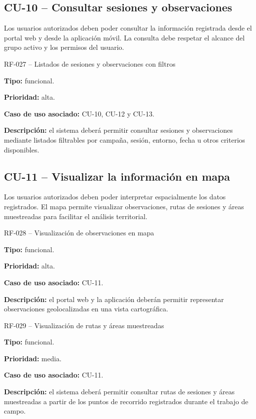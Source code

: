 \subsection{CU-10 -- Consultar sesiones y observaciones}

Los usuarios autorizados deben poder consultar la información registrada desde el
portal web y desde la aplicación móvil. La consulta debe respetar el alcance del
grupo activo y los permisos del usuario.

\begin{requisitocard}{RF-027 -- Listados de sesiones y observaciones con filtros}

\textbf{Tipo:} funcional.

\textbf{Prioridad:} alta.

\textbf{Caso de uso asociado:} CU-10, CU-12 y CU-13.

\textbf{Descripción:} el sistema deberá permitir consultar sesiones y
observaciones mediante listados filtrables por campaña, sesión, entorno, fecha u
otros criterios disponibles.

\end{requisitocard}

\subsection{CU-11 -- Visualizar la información en mapa}

Los usuarios autorizados deben poder interpretar espacialmente los datos
registrados. El mapa permite visualizar observaciones, rutas de sesiones y áreas
muestreadas para facilitar el análisis territorial.

\begin{requisitocard}{RF-028 -- Visualización de observaciones en mapa}

\textbf{Tipo:} funcional.

\textbf{Prioridad:} alta.

\textbf{Caso de uso asociado:} CU-11.

\textbf{Descripción:} el portal web y la aplicación deberán permitir representar
observaciones geolocalizadas en una vista cartográfica.

\end{requisitocard}

\begin{requisitocard}{RF-029 -- Visualización de rutas y áreas muestreadas}

\textbf{Tipo:} funcional.

\textbf{Prioridad:} media.

\textbf{Caso de uso asociado:} CU-11.

\textbf{Descripción:} el sistema deberá permitir consultar rutas de sesiones y
áreas muestreadas a partir de los puntos de recorrido registrados durante el
trabajo de campo.

\end{requisitocard}

